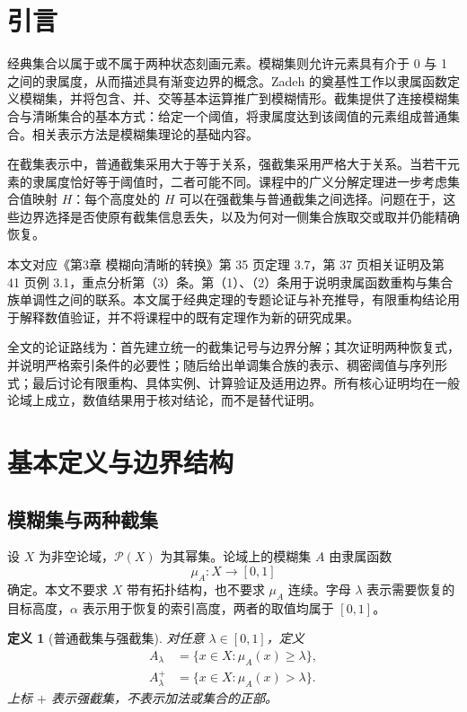 \documentclass[UTF8,fontset=fandol,zihao=-4,a4paper]{ctexart}
\numberwithin{equation}{section}
\theoremstyle{reportplain}
\newtheorem{definition}[theorem]{定义}
\newcommand{\Pow}{\mathcal P}
\newcommand{\muA}{\mu_A}
\newcommand{\cut}[1]{A_{#1}}
\newcommand{\scut}[1]{A_{#1}^{+}}
\newcommand{\set}[1]{\{#1\}}
\newcommand{\eqtag}[1]{\label{#1}}
\begin{document}
\section{引言}
经典集合以属于或不属于两种状态刻画元素。模糊集则允许元素具有介于 0 与 1 之间的隶属度，从而描述具有渐变边界的概念。Zadeh 的奠基性工作以隶属函数定义模糊集，并将包含、并、交等基本运算推广到模糊情形\cite{zadeh}。截集提供了连接模糊集合与清晰集合的基本方式：给定一个阈值，将隶属度达到该阈值的元素组成普通集合。相关表示方法是模糊集理论的基础内容\cite{klir,zimmermann}。

在截集表示中，普通截集采用大于等于关系，强截集采用严格大于关系。当若干元素的隶属度恰好等于阈值时，二者可能不同。课程中的广义分解定理进一步考虑集合值映射 $H$：每个高度处的 $H$ 可以在强截集与普通截集之间选择。问题在于，这些边界选择是否使原有截集信息丢失，以及为何对一侧集合族取交或取并仍能精确恢复。

本文对应《第3章 模糊向清晰的转换》第 35 页定理 3.7，第 37 页相关证明及第 41 页例 3.1\cite{course}，重点分析第（3）条。第（1）、（2）条用于说明隶属函数重构与集合族单调性之间的联系。本文属于经典定理的专题论证与补充推导，有限重构结论用于解释数值验证，并不将课程中的既有定理作为新的研究成果。

全文的论证路线为：首先建立统一的截集记号与边界分解；其次证明两种恢复式，并说明严格索引条件的必要性；随后给出单调集合族的表示、稠密阈值与序列形式；最后讨论有限重构、具体实例、计算验证及适用边界。所有核心证明均在一般论域上成立，数值结果用于核对结论，而不是替代证明。

\section{基本定义与边界结构}
\subsection{模糊集与两种截集}
设 $X$ 为非空论域，$\Pow(X)$ 为其幂集。论域上的模糊集 $A$ 由隶属函数
\begin{equation}
\muA:X\longrightarrow[0,1]
\eqtag{eq:membership}
\end{equation}
确定。本文不要求 $X$ 带有拓扑结构，也不要求 $\muA$ 连续。字母 $\lambda$ 表示需要恢复的目标高度，$\alpha$ 表示用于恢复的索引高度，两者的取值均属于 $[0,1]$。

\begin{definition}[普通截集与强截集]
对任意 $\lambda\in[0,1]$，定义
\begin{align}
\cut{\lambda}&=\set{x\in X:\muA(x)\ge\lambda},\eqtag{eq:ordinary}\\
\scut{\lambda}&=\set{x\in X:\muA(x)>\lambda}.\eqtag{eq:strong}
\end{align}
上标 $+$ 表示强截集，不表示加法或集合的正部。
\end{definition}
\end{document}
